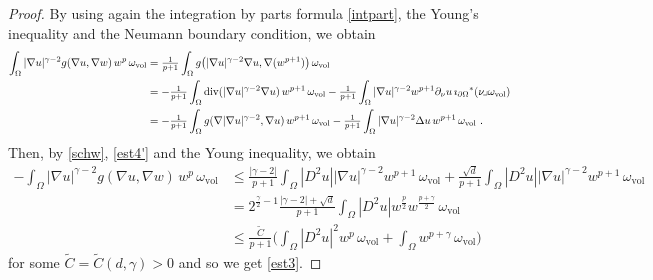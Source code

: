 \documentclass[10pt, a4paper, reqno, oneside]{amsart}
\theoremstyle{plain}
\theoremstyle{definition}
\theoremstyle{plain}
\theoremstyle{definition}
\theoremstyle{plain}
\renewcommand{\=}{:=}
\begin{document}
\begin{proof}
By using again the integration by parts formula \eqref{intpart}, the Young's inequality and the Neumann boundary condition, we obtain
\begin{equation} \label{est4'} \begin{aligned}
\int_\Omega |\nabla u|^{\gamma-2} g(\nabla u,\nabla w)\,w^p\,\omega_{\mathrm{vol}}
&= \tfrac1{p+1} \int_\Omega g\big(|\nabla u|^{\gamma-2}\nabla u ,\nabla(w^{p+1})\big)\,\omega_{\mathrm{vol}}\\
&= -\tfrac1{p+1} \int_\Omega {\rm div}(|\nabla u|^{\gamma-2}\nabla u)\,w^{p+1}\,\omega_{\mathrm{vol}}-\tfrac1{p+1} \int_\Omega |\nabla u|^{\gamma-2}w^{p+1}\partial_\nu u\, \imath_{\partial\Omega}{}^*(\nu \!\lrcorner \omega_{\mathrm{vol}}) \\
&= -\tfrac1{p+1} \int_\Omega g(\nabla|\nabla u|^{\gamma-2},\nabla u)\,w^{p+1}\,\omega_{\mathrm{vol}} -\tfrac1{p+1}\int_\Omega |\nabla u|^{\gamma-2}\Delta u\,w^{p+1}\,\omega_{\mathrm{vol}} \,\, .
\end{aligned} \end{equation}
Then, by \eqref{schw}, \eqref{est4'} and the Young inequality, we obtain
$$\begin{aligned}
-\int_\Omega |\nabla u|^{\gamma-2} g(\nabla u,\nabla w)\,w^p\,\omega_{\mathrm{vol}} &\leq \tfrac{|\gamma-2|}{p+1} \int_\Omega |D^2u||\nabla u|^{\gamma-2}w^{p+1}\,\omega_{\mathrm{vol}} +\tfrac{\sqrt{d}}{p+1}\int_\Omega |D^2u||\nabla u|^{\gamma-2}w^{p+1}\,\omega_{\mathrm{vol}} \\
&= 2^{\frac{\gamma}2-1}\tfrac{|\gamma-2|+\sqrt{d}}{p+1} \int_{\Omega}|D^2u|w^{\frac{p}{2}}w^{\frac{p+\gamma}2}\,\omega_{\mathrm{vol}} \\
&\leq \frac{\tilde{C}}{p+1} \bigg(\int_\Omega |D^2u|^2w^p\,\omega_{\mathrm{vol}}
+\int_\Omega w^{p+\gamma}\,\omega_{\mathrm{vol}}\bigg)
\end{aligned}$$
for some $\tilde{C}=\tilde{C}(d,\gamma)>0$ and so we get \eqref{est3}.


\end{proof}
\end{document}
